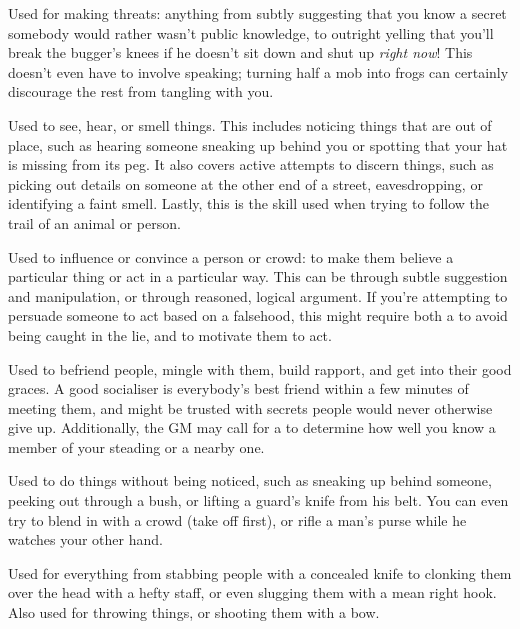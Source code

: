 
Used for making threats: anything from subtly suggesting that you know a secret somebody would rather wasn't public knowledge, to outright yelling that you'll break the bugger's knees if he doesn't sit down and shut up \emph{right now}!
This doesn't even have to involve speaking; turning half a mob into frogs can certainly discourage the rest from tangling with you.


Used to see, hear, or smell things.
This includes noticing things that are out of place, such as hearing someone sneaking up behind you or spotting that your hat is missing from its peg.
It also covers active attempts to discern things, such as picking out details on someone at the other end of a street, eavesdropping, or identifying a faint smell.
Lastly, this is the skill used when trying to follow the trail of an animal or person.


Used to influence or convince a person or crowd: to make them believe a particular thing or act in a particular way.
This can be through subtle suggestion and manipulation, or through reasoned, logical argument.
If you're attempting to persuade someone to act based on a falsehood, this might require both a  {\test} to avoid being caught in the lie, and  {\test} to motivate them to act.


Used to befriend people, mingle with them, build rapport, and get into their good graces.
A good socialiser is everybody's best friend within a few minutes of meeting them, and might be trusted with secrets people would never otherwise give up.
Additionally, the GM may call for a  {\test} to determine how well you know a member of your steading or a nearby one.


Used to do things without being noticed, such as sneaking up behind someone, peeking out through a bush, or lifting a guard's knife from his belt.
You can even try to blend in with a crowd (take {\thehat} off first), or rifle a man's purse while he watches your other hand.


Used for everything from stabbing people with a concealed knife to clonking them over the head with a hefty staff, or even slugging them with a mean right hook.
Also used for throwing things, or shooting them with a bow.

